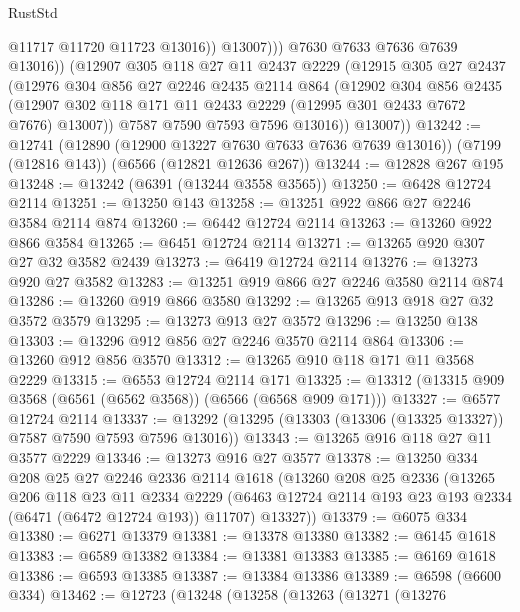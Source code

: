 \begin{lexlean}{RustStd}
\begin{coremodule}
                    @11717
                    @11720
                    @11723
                    @13016))
                @13007)))
          @7630
          @7633
          @7636
          @7639
          @13016))
      (@12907
        @305
        @118
        @27
        @11
        @2437
        @2229
        (@12915
          @305
          @27
          @2437
          (@12976
            @304
            @856
            @27
            @2246
            @2435
            @2114
            @864
            (@12902
              @304
              @856
              @2435
              (@12907 @302 @118 @171 @11 @2433 @2229 (@12995 @301 @2433 @7672 @7676) @13007))
            @7587
            @7590
            @7593
            @7596
            @13016))
        @13007))
@13242 := @12741
    (@12890 (@12900 @13227 @7630 @7633 @7636 @7639 @13016))
    (@7199 (@12816 @143))
    (@6566 (@12821 @12636 @267))
@13244 := @12828 @267 @195
@13248 := @13242 (@6391 (@13244 @3558 @3565))
@13250 := @6428 @12724 @2114
@13251 := @13250 @143
@13258 := @13251 @922 @866 @27 @2246 @3584 @2114 @874
@13260 := @6442 @12724 @2114
@13263 := @13260 @922 @866 @3584
@13265 := @6451 @12724 @2114
@13271 := @13265 @920 @307 @27 @32 @3582 @2439
@13273 := @6419 @12724 @2114
@13276 := @13273 @920 @27 @3582
@13283 := @13251 @919 @866 @27 @2246 @3580 @2114 @874
@13286 := @13260 @919 @866 @3580
@13292 := @13265 @913 @918 @27 @32 @3572 @3579
@13295 := @13273 @913 @27 @3572
@13296 := @13250 @138
@13303 := @13296 @912 @856 @27 @2246 @3570 @2114 @864
@13306 := @13260 @912 @856 @3570
@13312 := @13265 @910 @118 @171 @11 @3568 @2229
@13315 := @6553 @12724 @2114 @171
@13325 := @13312 (@13315 @909 @3568 (@6561 (@6562 @3568)) (@6566 (@6568 @909 @171)))
@13327 := @6577 @12724 @2114
@13337 := @13292 (@13295 (@13303 (@13306 (@13325 @13327)) @7587 @7590 @7593 @7596 @13016))
@13343 := @13265 @916 @118 @27 @11 @3577 @2229
@13346 := @13273 @916 @27 @3577
@13378 := @13250
    @334
    @208
    @25
    @27
    @2246
    @2336
    @2114
    @1618
    (@13260
      @208
      @25
      @2336
      (@13265
        @206
        @118
        @23
        @11
        @2334
        @2229
        (@6463 @12724 @2114 @193 @23 @193 @2334 (@6471 (@6472 @12724 @193)) @11707)
        @13327))
@13379 := @6075 @334
@13380 := @6271 @13379
@13381 := @13378 @13380
@13382 := @6145 @1618
@13383 := @6589 @13382
@13384 := @13381 @13383
@13385 := @6169 @1618
@13386 := @6593 @13385
@13387 := @13384 @13386
@13389 := @6598 (@6600 @334)
@13462 := @12723
    (@13248
      (@13258
        (@13263
          (@13271
            (@13276

\end{coremodule}
\end{lexlean}
